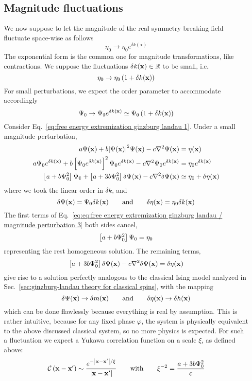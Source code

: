 \subsection{Magnitude fluctuations}

We now suppose to let the magnitude of the real symmetry breaking field fluctuate space-wise as follows
\[
    \eta_0 \to \eta_0 e^{\delta k(\mathbf{x})}
\]
The exponential form is the common one for magnitude transformations, like contractions. We suppose the fluctuations $\delta k (\mathbf{x}) \in \mathbb{R}$ to be small, i.e.
\[
    \eta_0 \to \eta_0 \left({ 1 + \delta k (\mathbf{x}) }\right)
\]
For small perturbations, we expect the order parameter to accommodate accordingly
\[
    \Psi_0 \to \Psi_0 e^{\delta k(\mathbf{x})} \simeq \Psi_0 \left({ 1 + \delta k (\mathbf{x}) }\right)
\]
Consider Eq.~\eqref{eq:free energy extremization ginzburg landau 1}. Under a small magnitude perturbation,
\begin{align}
     a \Psi(\mathbf{x}) + b \abs{\Psi(\mathbf{x})}^2 \Psi(\mathbf{x}) - c \laplacian \Psi(\mathbf{x}) &= \eta(\mathbf{x}) \label{eq:eq:free energy extremization ginzburg landau / magnitude perturbation 1} \\
     a \Psi_0 e^{\delta k(\mathbf{x})} + b \lrS{ \Psi_0 e^{\delta k(\mathbf{x})} }^2 \Psi_0 e^{\delta k(\mathbf{x})} - c \laplacian \Psi_0 e^{\delta k(\mathbf{x})} &= \eta_0 e^{\delta k(\mathbf{x})} \label{eq:eq:free energy extremization ginzburg landau / magnitude perturbation 2} \\
     \lrS{a + b \Psi_0^2} \Psi_0 + \lrS{a + 3b \Psi_0^2} \delta \Psi(\mathbf{x}) - c \laplacian \delta \Psi(\mathbf{x}) &\simeq \eta_0 + \delta\eta (\mathbf{x}) \label{eq:eq:free energy extremization ginzburg landau / magnitude perturbation 3}
\end{align}
where we took the linear order in $\delta k$, and
\[
    \delta\Psi(\mathbf{x}) = \Psi_0 \delta k(\mathbf{x})
    \quad\qq{and}\quad
    \delta\eta(\mathbf{x}) = \eta_0 \delta k(\mathbf{x})
\]
The first terms of Eq.~\eqref{eq:eq:free energy extremization ginzburg landau / magnitude perturbation 3} both sides cancel,
\[
    \left[{a + b \Psi_0^2}\right] \Psi_0 = \eta_0
\]
representing the rest homogeneous solution. The remaining terms,
\[
    \lrS{a + 3b \Psi_0^2} \delta \Psi(\mathbf{x}) - c \laplacian \delta \Psi(\mathbf{x}) = \delta\eta (\mathbf{x})
\]
give rise to a solution perfectly analogous to the classical Ising model analyzed in Sec.~\ref{sec:ginzburg-landau theory for classical spins}, with the mapping
\[
    \delta \Psi(\mathbf{x}) \to \delta m(\mathbf{x})
    \quad\qq{and}\quad
    \delta \eta(\mathbf{x}) \to \delta h(\mathbf{x})
\]
which can be done flawlessly because everything is real by assumption. This is rather intuitive, because for any fixed phase $\varphi$, the system is physically equivalent to the above discussed classical system, so no more physics is expected. For such a fluctuation we expect a Yukawa correlation function on a scale $\xi$, as defined above:
\[
    \mathcal{C} \lrR{ \mathbf{x} - \mathbf{x}' } \sim \frac{e^{-\abs{\mathbf{x}-\mathbf{x}'}/\xi}}{\abs{\mathbf{x}-\mathbf{x}'}}
    \quad\qq{with}\quad
    \xi^{-2} = \frac{a + 3b\Psi_0^2}{c}
\]

